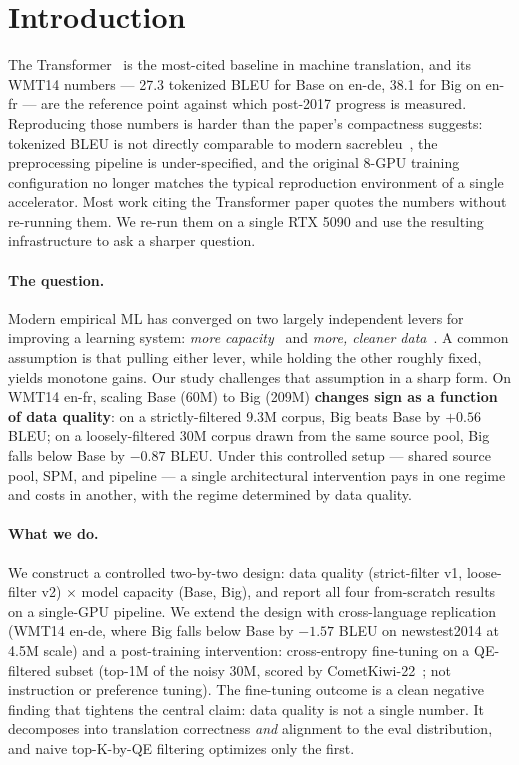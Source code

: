 \section{Introduction}

The Transformer~\cite{vaswani2017attention} is the most-cited baseline in machine translation, and its WMT14 numbers --- 27.3 tokenized BLEU for Base on en-de, 38.1 for Big on en-fr --- are the reference point against which post-2017 progress is measured. Reproducing those numbers is harder than the paper's compactness suggests: tokenized BLEU is not directly comparable to modern sacrebleu~\cite{post2018call}, the preprocessing pipeline is under-specified, and the original 8-GPU training configuration no longer matches the typical reproduction environment of a single accelerator. Most work citing the Transformer paper quotes the numbers without re-running them. We re-run them on a single RTX 5090 and use the resulting infrastructure to ask a sharper question.

\paragraph{The question.}
Modern empirical ML has converged on two largely independent levers for improving a learning system: \emph{more capacity}~\cite{kaplan2020scaling, hoffmann2022chinchilla} and \emph{more, cleaner data}~\cite{penedo2023refinedweb, gururangan2020dont}. A common assumption is that pulling either lever, while holding the other roughly fixed, yields monotone gains. Our study challenges that assumption in a sharp form. On WMT14 en-fr, scaling Base (60M) to Big (209M) \textbf{changes sign as a function of data quality}: on a strictly-filtered 9.3M corpus, Big beats Base by $+0.56$ BLEU; on a loosely-filtered 30M corpus drawn from the same source pool, Big falls below Base by $-0.87$ BLEU. Under this controlled setup --- shared source pool, SPM, and pipeline --- a single architectural intervention pays in one regime and costs in another, with the regime determined by data quality.

\paragraph{What we do.}
We construct a controlled two-by-two design: data quality (strict-filter v1, loose-filter v2) $\times$ model capacity (Base, Big), and report all four from-scratch results on a single-GPU pipeline. We extend the design with cross-language replication (WMT14 en-de, where Big falls below Base by $-1.57$ BLEU on newstest2014 at 4.5M scale) and a post-training intervention: cross-entropy fine-tuning on a QE-filtered subset (top-1M of the noisy 30M, scored by CometKiwi-22~\cite{rei2022cometkiwi}; not instruction or preference tuning). The fine-tuning outcome is a clean negative finding that tightens the central claim: data quality is not a single number. It decomposes into translation correctness \emph{and} alignment to the eval distribution, and naive top-K-by-QE filtering optimizes only the first.

